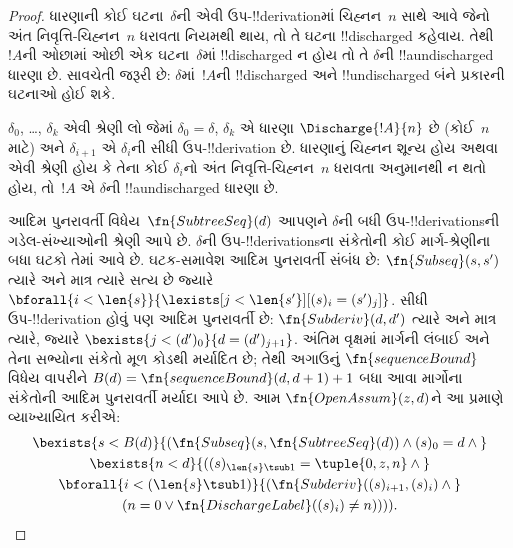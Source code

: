 \documentclass[../../../include/open-logic-section]{subfiles}
\begin{document}
\begin{proof}
  ધારણાની કોઈ ઘટના~$\delta$ની એવી
  ઉપ-!!{derivation}માં ચિહ્નન~$n$
  સાથે આવે જેનો અંત નિવૃત્તિ-ચિહ્નન~$n$
  ધરાવતા નિયમથી થાય, તો તે ઘટના
  !!{discharged} કહેવાય. તેથી~$!A$ની
  ઓછામાં ઓછી એક ઘટના~$\delta$માં
  !!{discharged} ન હોય તો તે
  $\delta$ની !!a{undischarged} ધારણા છે.
  સાવચેતી જરૂરી છે: $\delta$માં~$!A$ની
  !!{discharged} અને
  !!{undischarged} બંને પ્રકારની
  ઘટનાઓ હોઈ શકે.

  $\delta_0$, \dots, $\delta_k$ એવી
  શ્રેણી લો જેમાં $\delta_0 =
  \delta$, $\delta_k$ એ ધારણા
  $\Discharge{!A}{n}$ છે (કોઈ~$n$
  માટે) અને $\delta_{i+1}$ એ
  $\delta_i$ની સીધી ઉપ-!!{derivation}
  છે. ધારણાનું ચિહ્નન શૂન્ય હોય અથવા એવી શ્રેણી
  હોય કે તેના કોઈ $\delta_i$નો અંત
  નિવૃત્તિ-ચિહ્નન~$n$ ધરાવતા
  અનુમાનથી ન થતો હોય, તો~$!A$ એ
  $\delta$ની !!a{undischarged}
  ધારણા છે.

  આદિમ પુનરાવર્તી
  વિધેય~$\fn{SubtreeSeq}(d)$ આપણને
  $\delta$ની બધી ઉપ-!!{derivation}sની
  ગડેલ-સંખ્યાઓની શ્રેણી આપે છે.
  $\delta$ની ઉપ-!!{derivation}sના
  સંકેતોની કોઈ માર્ગ-શ્રેણીના બધા
  ઘટકો તેમાં આવે છે. ઘટક-સમાવેશ
  આદિમ પુનરાવર્તી સંબંધ છે:
  $\fn{Subseq}(s, s')$ ત્યારે અને
  માત્ર ત્યારે સત્ય છે જ્યારે
  $\bforall{i<\len{s}}{\lexists[j<\len{s'}][(s)_i = (s')_j]}$.
  સીધી ઉપ-!!{derivation} હોવું પણ
  આદિમ પુનરાવર્તી છે:
  $\fn{Subderiv}(d, d')$ ત્યારે અને
  માત્ર ત્યારે, જ્યારે
  $\bexists{j<(d')_0}{d = (d')_{j+1}}$.
  અંતિમ વૃક્ષમાં માર્ગની લંબાઈ અને
  તેના સભ્યોના સંકેતો મૂળ કોડથી
  મર્યાદિત છે; તેથી અગાઉનું
  $\fn{sequenceBound}$ વિધેય
  વાપરીને $B(d)=\fn{sequenceBound}(d,d+1)+1$
  બધા આવા માર્ગોના સંકેતોની
  આદિમ પુનરાવર્તી મર્યાદા આપે છે.
  આમ $\fn{OpenAssum}(z, d)$ને
  આ પ્રમાણે વ્યાખ્યાયિત કરીએ:
  \begin{multline*}
    \bexists{s<B(d)}{(\fn{Subseq}(s, \fn{SubtreeSeq}(d))
      \land (s)_0 = d \land {}} \\
    \bexists{n<d}{((s)_{\len{s} \tsub 1} = \tuple{0, z, n} \land {}}\\
      \bforall{i<(\len{s} \tsub 1)}{(\fn{Subderiv}((s)_{i+1}, (s)_i) \land {}}\\
      (n=0 \lor \fn{DischargeLabel}((s)_i) \neq n)))).
  \end{multline*}
\end{proof}
\end{document}
